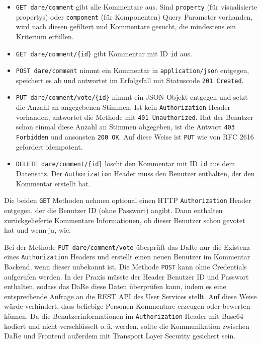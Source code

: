 \documentclass[
	headsepline,
	footsepline,
	fontsize=12pt,
	bibliography=totoc
]{scrbook}
\begin{document}
\begin{itemize}
	\item \texttt{GET dare/comment} gibt alle Kommentare aus. Sind \texttt{property} (für visualisierte propertys) oder \texttt{component} (für Komponenten) Query Parameter vorhanden, wird nach diesen gefiltert und Kommentare gesucht, die mindestens ein Kriterium erfüllen.
	\item \texttt{GET dare/comment/\{id\}} gibt Kommentar mit ID \texttt{id} aus.
	\item \texttt{POST dare/comment} nimmt ein Kommentar in \texttt{application/json} entgegen, speichert es ab und antwortet im Erfolgsfall mit Statuscode \texttt{201 Created}.
	\item \texttt{PUT dare/comment/vote/\{id\}} nimmt ein JSON Objekt entgegen und setzt die Anzahl an angegebenen Stimmen. Ist kein \texttt{Authorization} Header vorhanden, antwortet die Methode mit \texttt{401 Unauthorized}. Hat der Benutzer schon einmal diese Anzahl an Stimmen abgegeben, ist die Antwort \texttt{403 Forbidden} und ansonsten \texttt{200 OK}. Auf diese Weise ist \texttt{PUT} wie von RFC 2616 \cite{W3C:rfc2616} gefordert idempotent.
	\item \texttt{DELETE dare/comment/\{id\}} löscht den Kommentar mit ID \texttt{id} aus dem Datensatz. Der \texttt{Authorization} Header muss den Benutzer enthalten, der den Kommentar erstellt hat.
\end{itemize}

Die beiden \texttt{GET} Methoden nehmen optional einen HTTP \texttt{Authorization} Header entgegen, der die Benutzer ID (ohne Passwort) angibt. Dann enthalten zurückgelieferte Kommentare Informationen, ob dieser Benutzer schon gevotet hat und wenn ja, wie.

Bei der Methode \texttt{PUT dare/comment/vote} überprüft das DaRe nur die Existenz eines \texttt{Authorization} Headers und erstellt einen neuen Benutzer im Kommentar Backend, wenn dieser unbekannt ist. Die Methode \texttt{POST} kann ohne Credentials aufgerufen werden. In der Praxis müsste der Header Benutzer ID und Passwort enthalten, sodass das DaRe diese Daten überprüfen kann, indem es eine entsprechende Anfrage an die REST API des User Services stellt. Auf diese Weise würde verhindert, dass beliebige Personen Kommentare erzeugen oder bewerten können. Da die Benutzerinformationen im \texttt{Authorization} Header mit Base64 \cite{Josefsson2006} kodiert und nicht verschlüsselt o.\,ä. werden, sollte die Kommunikation zwischen DaRe und Frontend außerdem mit Transport Layer Security gesichert sein.
\end{document}
